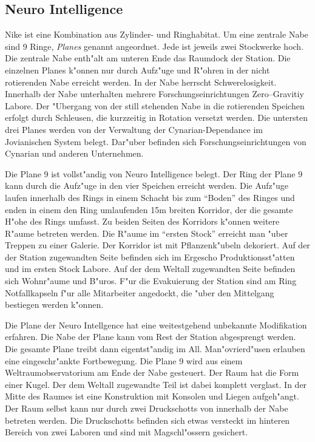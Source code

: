 \subsection{Neuro Intelligence}

Nike ist eine Kombination aus Zylinder- und Ringhabitat. Um eine zentrale Nabe sind 9 Ringe, \emph{Planes} genannt angeordnet. Jede ist jeweils zwei Stockwerke hoch. Die zentrale Nabe enth"alt am unteren Ende das Raumdock der Station.  Die einzelnen Planes k"onnen nur durch Aufz"uge und R"ohren in der nicht rotierenden Nabe erreicht werden. In der Nabe herrscht Schwerelosigkeit. Innerhalb der Nabe unterhalten mehrere Forschungseinrichtungen Zero--Gravitiy Labore. Der "Ubergang von der still stehenden Nabe in die rotierenden Speichen erfolgt durch Schleusen, die kurzzeitig in Rotation versetzt werden. Die untersten drei Planes werden von der Verwaltung der Cynarian-Dependance im Jovianischen System belegt. Dar"uber befinden sich Forschungseinrichtungen von Cynarian und anderen Unternehmen.

Die Plane 9 ist vollst"andig von Neuro Intelligence belegt. Der Ring der Plane 9 kann durch die Aufz"uge in den vier Speichen erreicht werden. Die Aufz"uge laufen innerhalb des Rings in einem Schacht bis zum "`Boden"' des Ringes und enden in einem den Ring umlaufenden 15m breiten Korridor, der die gesamte H"ohe des Rings umfasst. Zu beiden Seiten des Korridors k"onnen weitere R"aume betreten werden. Die R"aume im "`ersten Stock"' erreicht man "uber Treppen zu einer Galerie. Der Korridor ist mit Pflanzenk"ubeln dekoriert. Auf der der Station zugewandten Seite befinden sich im Ergescho\3 Produktionsst"atten und im ersten Stock Labore. Auf der dem Weltall zugewandten Seite befinden sich Wohnr"aume und B"uros. F"ur die Evakuierung der Station sind am Ring Notfallkapseln f"ur alle Mitarbeiter angedockt, die "uber den Mittelgang bestiegen werden k"onnen.

Die Plane der Neuro Intellgence hat eine weitestgehend unbekannte Modifikation erfahren. Die Nabe der Plane kann vom Rest der Station abgesprengt werden. Die gesamte Plane treibt dann eigentst"andig im All. Man"ovrierd"usen erlauben eine eingeschr"ankte Fortbewegung. Die Plane 9 wird aus einem Weltraumobservatorium am Ende der Nabe gesteuert. Der Raum hat die Form einer Kugel. Der dem Weltall zugewandte Teil ist dabei komplett verglast. In der Mitte des Raumes ist eine Konstruktion mit Konsolen und Liegen aufgeh"angt. Der Raum selbst kann nur durch zwei Druckschotts von innerhalb der Nabe betreten werden. Die Druckschotts befinden sich etwas versteckt im hinteren Bereich von zwei Laboren und sind mit Magschl"ossern gesichert.

